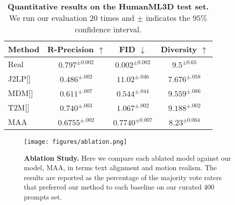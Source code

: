 \documentclass[10pt,twocolumn,letterpaper]{article}
\begin{document}
\begin{table}[t]
    \begin{center}
        \setlength{\tabcolsep}{2pt}
            \begin{tabular}{lccc}
                \toprule
                \textbf{Method} & 
                R-Precision $\uparrow$ &
                FID $\downarrow$ &
                Diversity $\uparrow$ \\
                \midrule
                 Real &
                $0.797^{\pm 0.002}$ &
                 $0.002^{\pm 0.002}$&
                 $9.5^{\pm 0.65}$ \\
                 \midrule
                J2LP[\cite{ahuja2019jl2p}] &
                 $0.486^{\pm .002}$&
                 $11.02^{\pm .046}$&
                 $7.676^{\pm .058}$ \\

                 MDM[\cite{tevet2022mdm}] &
                 $0.611^{\pm.007}$&
                 $0.544^{\pm .044}$&
                 $9.559^{\pm .086}$ \\
                  T2M[\cite{guo2022t2m}] &
                 $0.740^{\pm .003} $&
                 $1.067^{\pm .002}$&
                 $9.188^{\pm .002}$ \\
                 \midrule
                MAA &
                 $0.6755 ^{\pm .002} $&
                 $0.7740 ^{\pm  0.007 }$&
                 $8.23^{\pm 0.064}$ \\

                \bottomrule
            \end{tabular}
    \caption{\textbf{ Quantitative results on the HumanML3D test set.} We run our evaluation 20 times and $\pm$ indicates the $95\%$
confidence interval.}
    \vspace{-2em}
    \label{tab:auto}
    \end{center}
\end{table}
 
\begin{figure}
  \centering \texttt{[image: figures/ablation.png]}
  \caption{\textbf{Ablation Study.} Here we compare each ablated model against our model, MAA, in terms text alignment and motion realism.
The results are reported as the percentage of the majority vote raters that
preferred our method to each baseline on our curated 400 prompts set.}
  \label{fig:ablation}
\end{figure}
\end{document}
